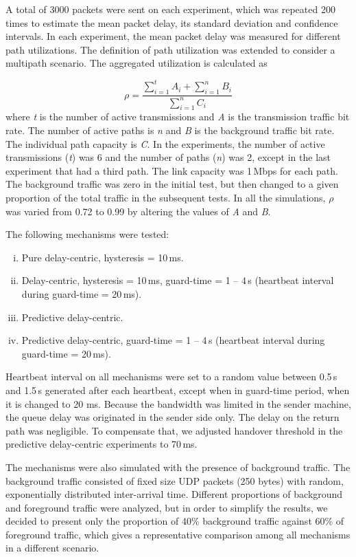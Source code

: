 \documentclass{sbrt2015}
\begin{document}
A total of 3000 packets were sent on each experiment, which was repeated 200 times to estimate the mean packet delay, its standard deviation and confidence intervals. In each experiment, the mean packet delay was measured for different path utilizations. The definition of path utilization was extended to consider a multipath scenario. The aggregated utilization is calculated as 

\begin{equation}
 \rho = \frac{\sum\limits_{i=1}^{t}A_i + \sum\limits_{i=1}^{n}B_i}{\sum\limits_{i=1}^{n}C_i}
\end{equation}
where \textit{t} is the number of active transmissions and \textit{A} is the transmission traffic bit rate. The number of active paths is \textit{n} and \textit{B} is the background traffic bit rate. The individual path capacity is \textit{C}. In the experiments, the number of active transmissions (\textit{t}) was 6 and the number of paths (\textit{n}) was 2, except in the last experiment that had a third path. The link capacity was 1\,Mbps for each path. 
The background traffic was zero in the initial test, but then changed to a given proportion of the total traffic in the subsequent tests. In all the simulations, $\rho$ was varied from 0.72 to 0.99 by altering the values of \textit{A} and \textit{B}.

The following mechanisms were tested:
\begin{enumerate}[i)]
 \item Pure delay-centric, hysteresis = 10\,ms.
 \item Delay-centric, hysteresis = 10\,ms, guard-time = 1 -- 4\,s (heartbeat interval during guard-time = 20\,ms).
 \item Predictive delay-centric.
 \item Predictive delay-centric, guard-time = 1 -- 4\,s (heartbeat interval during guard-time = 20\,ms).
\end{enumerate}

Heartbeat interval on all mechanisms were set to a random value between 0.5\,s and 1.5\,s generated after each heartbeat, except when in guard-time period, when it is changed to 20 ms.
Because the bandwidth was limited in the sender machine, the queue delay was originated in the sender side only. The delay on the return path was negligible. To compensate that, we adjusted handover threshold in the predictive delay-centric experiments to 70\,ms.

The mechanisms were also simulated with the presence of background traffic. The background traffic consisted of fixed size UDP packets (250 bytes) with random, exponentially distributed inter-arrival time. Different proportions of background and foreground traffic were analyzed, but in order to simplify the results, we decided to present only the proportion of 40\% background traffic against 60\% of foreground traffic, which gives a representative comparison among all mechanisms in a different scenario.
\end{document}
